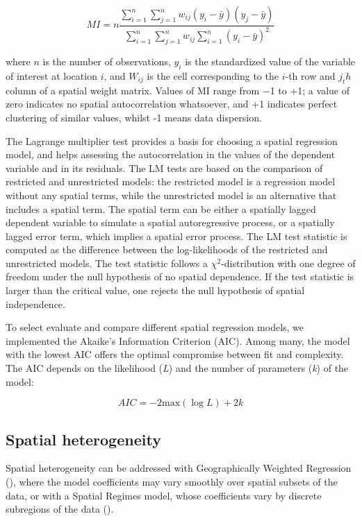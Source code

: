 \documentclass[
  manuscript=article,  
  layout=preprint,  
  year=2023,
  volume=0,
]{format}
\begin{document}
\begin{equation} \label{eq:1}
    MI = n \frac{\sum_{i=1}^n \sum_{j=1}^n w_{ij} (y_i-\bar{y}) (y_j-\bar{y})} {\sum_{i=1}^n \sum_{j=1}^n w_{ij} \sum_{i=1}^n (y_i-\bar{y})^2}
\end{equation}

where $n$ is the number of observations, $y_i$ is the standardized value of the variable of interest at location $i$, and $W_{ij}$ is the cell corresponding to the $i$-th row and $j_th$ column of a spatial weight matrix. Values of MI range from $-$1 to $+$1; a value of zero indicates no spatial autocorrelation whatsoever, and +1 indicates perfect clustering of similar values, whilst -1 means data dispersion.

\par The Lagrange multiplier test provides a basis for choosing a spatial regression model, and helps assessing the autocorrelation in the values of the dependent variable and in its residuals. The LM tests are based on the comparison of restricted and unrestricted models: the restricted model is a regression model without any spatial terms, while the unrestricted model is an alternative that includes a spatial term. The spatial term can be either a spatially lagged dependent variable to simulate a spatial autoregressive process, or a spatially lagged error term, which implies a spatial error process. The LM test statistic is computed as the difference between the log-likelihoods of the restricted and unrestricted models. The test statistic follows a $\chi^2$-distribution with one degree of freedom under the null hypothesis of no spatial dependence. If the test statistic is larger than the critical value, one rejects the null hypothesis of spatial independence.

To select evaluate and compare different spatial regression models, we implemented the Akaike's Information Criterion (AIC). Among many, the model with the lowest AIC offers the optimal compromise between fit and complexity. The AIC depends on the likelihood (\textit{L}) and the number of parameters (\textit{k}) of the model:

\begin{equation} \label{eq:1}
    AIC = -2\text{max}(\log L)+2k
\end{equation}

\subsection{Spatial heterogeneity}
\par Spatial heterogeneity can be addressed with Geographically Weighted Regression (\cite{fotheringham2000quantitative}), where the model coefficients may vary smoothly over spatial subsets of the data, or with a Spatial Regimes model, whose coefficients vary by discrete subregions of the data (\cite{brunsdon1996geographically}).
\end{document}
